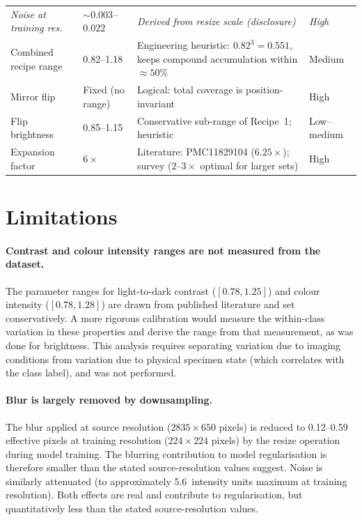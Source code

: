 \documentclass[11pt,a4paper]{article}
\begin{document}
\begin{table}[htbp]
\begin{tabular}{L{2.6cm} L{2.4cm} L{6.7cm} L{2.5cm}}
    \textit{Noise at training res.} & \textit{${\sim}0.003$--$0.022$}
      & \textit{Derived from resize scale (disclosure)}
      & \textit{High} \\[3pt]
    Combined recipe range   & 0.82--1.18
      & Engineering heuristic: $0.82^3 = 0.551$, keeps compound
        accumulation within ${\approx}50\%$
      & Medium \\[3pt]
    Mirror flip             & Fixed (no range)
      & Logical: total coverage is position-invariant
      & High \\[3pt]
    Flip brightness         & 0.85--1.15
      & Conservative sub-range of Recipe~1; heuristic
      & Low--medium \\[3pt]
    Expansion factor        & $6\times$
      & Literature: PMC11829104 ($6.25\times$); survey ($2$--$3\times$
        optimal for larger sets)
      & High \\[3pt]
    \bottomrule
  \end{tabular}
\end{table}

\section{Limitations}
\label{sec:limitations}

\paragraph{Contrast and colour intensity ranges are not measured from the dataset.}
The parameter ranges for light-to-dark contrast ($[0.78, 1.25]$) and colour intensity ($[0.78, 1.28]$) are drawn from published literature and set conservatively. A more rigorous calibration would measure the within-class variation in these properties and derive the range from that measurement, as was done for brightness. This analysis requires separating variation due to imaging conditions from variation due to physical specimen state (which correlates with the class label), and was not performed.

\paragraph{Blur is largely removed by downsampling.}
The blur applied at source resolution ($2835 \times 650$ pixels) is reduced to 0.12--0.59 effective pixels at training resolution ($224 \times 224$ pixels) by the resize operation during model training. The blurring contribution to model regularisation is therefore smaller than the stated source-resolution values suggest. Noise is similarly attenuated (to approximately 5.6~intensity units maximum at training resolution). Both effects are real and contribute to regularisation, but quantitatively less than the stated source-resolution values.
\end{document}
